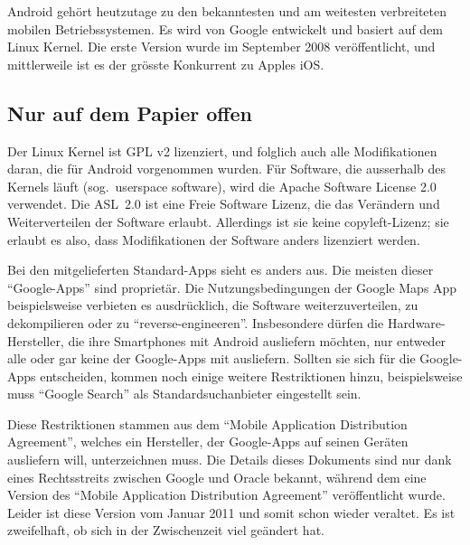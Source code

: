 Android gehört heutzutage zu den bekanntesten und am weitesten verbreiteten mobilen Betriebssystemen. Es wird von Google entwickelt und basiert auf dem Linux Kernel. Die erste Version wurde im September 2008 veröffentlicht, und mittlerweile ist es der grösste Konkurrent zu Apples iOS.
\newline

\subsection{Nur auf dem Papier offen}
Der Linux Kernel ist GPL v2 lizenziert\thinspace\cite{online:kernel-license}, und folglich auch alle Modifikationen daran, die für Android vorgenommen wurden. Für Software, die ausserhalb des Kernels läuft (sog.\ userspace software), wird die Apache Software License 2.0 verwendet\thinspace\cite{online:android-licenses}. Die \mbox{ASL 2.0} ist eine Freie Software Lizenz, die das Verändern und Weiterverteilen der Software erlaubt. Allerdings ist sie  keine copyleft-Lizenz; sie erlaubt es also, dass Modifikationen der Software anders lizenziert werden\thinspace\cite{online:apache-license}.

Bei den mitgelieferten Standard-Apps sieht es anders aus. Die meisten dieser ``Google-Apps'' sind proprietär. Die Nutzungsbedingungen der Google Maps App beispielsweise verbieten es ausdrücklich, die Software weiterzuverteilen, zu dekompilieren oder zu ``reverse-engineeren''\thinspace\cite{online:google-maps-tos}. Insbesondere dürfen die \mbox{Hardware-Hersteller}, die ihre Smartphones mit Android ausliefern möchten, nur entweder alle oder gar keine der Google-Apps mit ausliefern. Sollten sie sich für die Google-Apps entscheiden, kommen noch einige weitere Restriktionen hinzu, beispielsweise muss ``Google Search'' als Standardsuchanbieter eingestellt sein\thinspace\cite{online:mada-leak}.

Diese Restriktionen stammen aus dem ``Mobile Application Distribution Agreement'', welches ein Hersteller, der Google-Apps auf seinen Geräten ausliefern will, unterzeichnen muss. Die Details dieses Dokuments sind nur dank eines Rechtsstreits zwischen Google und Oracle bekannt, während dem eine Version des ``Mobile Application Distribution Agreement'' veröffentlicht wurde\thinspace\cite{online:ars-mada-leak}. Leider ist diese Version vom Januar 2011 und somit schon wieder veraltet. Es ist zweifelhaft, ob sich in der Zwischenzeit viel geändert hat.
\newline


